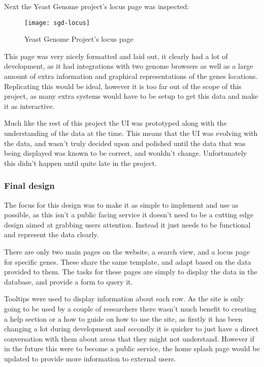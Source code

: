 Next the Yeast Genome\cite{sgd} project's locus page was inspected:

\begin{figure}[H]
\begin{center}
\texttt{[image: sgd-locus]}
\caption{Yeast Genome Project's locus page}
\end{center}
\end{figure}

This page was very nicely formatted and laid out, it clearly had a lot of development, as it had integrations with two genome browsers as well as a large amount of extra information and graphical representations of the genes locations. Replicating this would be ideal, however it is too far out of the scope of this project, as many extra systems would have to be setup to get this data and make it as interactive.

Much like the rest of this project the UI was prototyped along with the understanding of the data at the time. This means that the UI was evolving with the data, and wasn't truly decided upon and polished until the data that was being displayed was known to be correct, and wouldn't change. Unfortunately this didn't happen until quite late in the project. 

\subsubsection{Final design}
The focus for this design was to make it as simple to implement and use as possible, as this isn't a public facing service it doesn't need to be a cutting edge design aimed at grabbing users attention. Instead it just needs to be functional and represent the data clearly. 

There are only two main pages on the website, a search view, and a locus page for specific genes. These share the same template, and adapt based on the data provided to them. The tasks for these pages are simply to display the data in the database, and provide a form to query it.

Tooltips were used to display information about each row. As the site is only going to be used by a couple of researchers there wasn't much benefit to creating a help section or a how to guide on how to use the site, as firstly it has been changing a lot during development and secondly it is quicker to just have a direct conversation with them about areas that they might not understand. However if in the future this were to become a public service, the home splash page would be updated to provide more information to external users.

